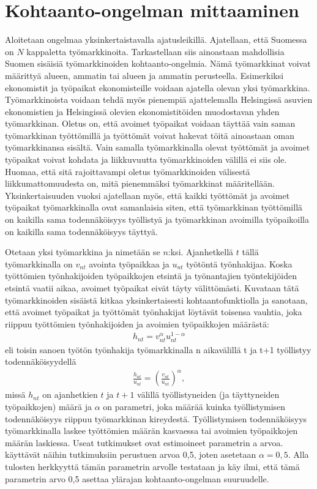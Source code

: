 \documentclass[12pt]{article}
\begin{document}
\section{Kohtaanto-ongelman mittaaminen} \label{section:kohtaanto-ongelman mittaaminen}

Aloitetaan ongelmaa yksinkertaistavalla ajatusleikillä. Ajatellaan, että Suomessa on $N$ kappaletta työmarkkinoita. Tarkastellaan siis ainoastaan mahdollisia Suomen sisäisiä työmarkkinoiden kohtaanto-ongelmia. Nämä työmarkkinat voivat määrittyä alueen, ammatin tai alueen ja ammatin perusteella. Esimerkiksi ekonomistit ja työpaikat ekonomisteille voidaan ajatella olevan yksi työmarkkina. Työmarkkinoista voidaan tehdä myös pienempiä ajattelemalla Helsingissä asuvien ekonomistien ja Helsingissä olevien ekonomistitöiden muodostavan yhden työmarkkinan. Oletus on, että avoimet työpaikat voidaan täyttää vain saman työmarkkinan työttömillä ja työttömät voivat hakevat töitä ainoastaan oman työmarkkinansa sisältä. Vain samalla työmarkkinalla olevat työttömät ja avoimet työpaikat voivat kohdata ja liikkuvuutta työmarkkinoiden välillä ei siis ole. Huomaa, että sitä rajoittavampi oletus työmarkkinoiden välisestä liikkumattomuudesta on, mitä pienemmäksi työmarkkinat määritellään. Yksinkertaisuuden vuoksi ajatellaan myös, että kaikki työttömät ja avoimet työpaikat työmarkkinalla ovat samanlaisia siten, että työmarkkinan työttömillä on kaikilla sama todennäköisyys työllistyä ja työmarkkinan avoimilla työpaikoilla on kaikilla sama todennäköisyys täyttyä.

Otetaan yksi työmarkkina ja nimetään se $n$:ksi. Ajanhetkellä $t$ tällä työmarkkinalla on $v_{nt}$ avointa työpaikkaa ja $u_{nt}$ työtöntä työnhakijaa. Koska työttömien työnhakijoiden työpaikkojen etsintä ja työnantajien työntekijöiden etsintä vaatii aikaa, avoimet työpaikat eivät täyty välittömästi. Kuvataan tätä työmarkkinoiden sisäistä kitkaa yksinkertaisesti kohtaantofunktiolla ja sanotaan, että avoimet työpaikat ja työttömät työnhakijat löytävät toisensa vauhtia, joka riippuu työttömien työnhakijoiden ja avoimien työpaikkojen määrästä: 
\begin{align}
h_{nt} = v_{nt}^\alpha u_{nt}^{1-\alpha}
\label{eq:kcowwd}
\end{align}
eli toisin sanoen työtön työnhakija työmarkkinalla n aikavälillä t ja t+1 työllistyy todennäköisyydellä 
\begin{align*}
\frac{h_{nt}}{u_{nt}} = \left ( \frac{v_{nt}}{u_{nt}} \right ) ^\alpha,
\end{align*}
missä $h_{nt}$ on ajanhetkien $t$ ja $t+1$ välillä työllistyneiden (ja täyttyneiden työpaikkojen) määrä ja $\alpha$ on parametri, joka määrää kuinka työllistymisen todennäköisyys riippuu työmarkkinan kireydestä. Työllistymisen todennäköisyys työmarkkinalla laskee työttömien määrän kasvaessa tai avoimien työpaikkojen määrän laskiessa. Useat tutkimukset ovat estimoineet parametrin a arvoa.  käyttävät näihin tutkimuksiin perustuen arvoa 0,5, joten asetetaan $\alpha= 0,5$. Alla tulosten herkkyyttä tämän parametrin arvolle testataan ja käy ilmi, että tämä parametrin arvo 0,5 asettaa ylärajan kohtaanto-ongelman suuruudelle.
\end{document}
